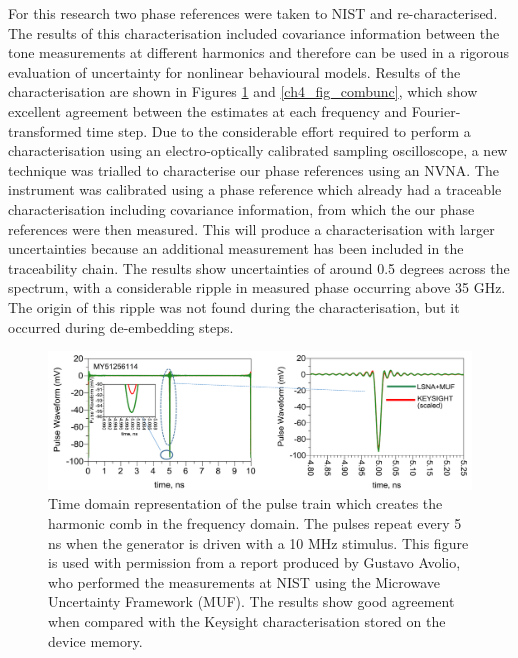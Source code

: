 \documentclass[../thesis/thesis.tex]{subfiles}
\begin{document}
For this research two phase references were taken to NIST and re-characterised. The results of this characterisation included covariance information between the tone measurements at different harmonics and therefore can be used in a rigorous evaluation of uncertainty for nonlinear behavioural models. Results of the characterisation are shown in Figures \ref{ch4_fig_comb} and \ref{ch4_fig_combunc}, which show excellent agreement between the estimates at each frequency and Fourier-transformed time step. Due to the considerable effort required to perform a characterisation using an electro-optically calibrated sampling oscilloscope, a new technique was trialled to characterise our phase references using an NVNA. The instrument was calibrated using a phase reference which already had a traceable characterisation including covariance information, from which the our phase references were then measured. This will produce a characterisation with larger uncertainties because an additional measurement has been included in the traceability chain. The results show uncertainties of around 0.5 degrees across the spectrum, with a considerable ripple in measured phase occurring above 35 GHz. The origin of this ripple was not found during the characterisation, but it occurred during de-embedding steps.

\begin{figure}
	\centering
	\includegraphics[width=\textwidth]{comb.png}
	\caption[Time domain representation of the pulse train which creates the harmonic comb in the frequency domain.]{Time domain representation of the pulse train which creates the harmonic comb in the frequency domain. The pulses repeat every 5 ns when the generator is driven with a 10 MHz stimulus. This figure is used with permission from a report produced by Gustavo Avolio\footnotemark, who performed the measurements at NIST using the Microwave Uncertainty Framework (MUF). The results show good agreement when compared with the Keysight characterisation stored on the device memory.}
	\label{ch4_fig_comb}
\end{figure}
\end{document}
